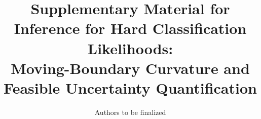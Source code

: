 \documentclass[12pt,a4paper]{article}
\title{Supplementary Material for\\
Inference for Hard Classification Likelihoods:\\
Moving-Boundary Curvature and Feasible Uncertainty Quantification}
\author{Authors to be finalized}
\date{}
\theoremstyle{definition}
\begin{document}
\maketitle
\renewcommand{\theequation}{S.\arabic{equation}}
\setcounter{equation}{0}






\end{document}
